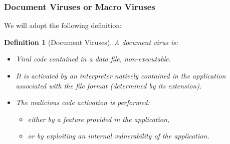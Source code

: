 \documentclass{beamer}
\newtheorem{deft}{Definition}
\begin{document}

%


\begin{frame}
\frametitle{Document Viruses or Macro Viruses}
We will adopt the following definition:

\begin{deft}[Document Viruses]
A document virus is:
\begin{itemize}
\item Viral code contained in a {\color{blue} data file, non-executable.}
\pause
\item It is activated by {\color{blue} an interpreter} natively contained in the application associated with the file format (determined by its extension).
\pause
\item The malicious code activation is performed:
\begin{itemize}
\item either by a feature provided in the application,
\item or by exploiting an internal vulnerability of the application.
\end{itemize}
\end{itemize}
\end{deft}

\end{frame}
\end{document}
